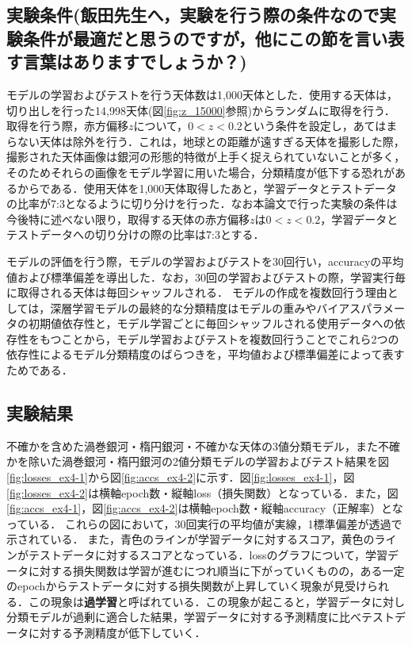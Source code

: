 \documentclass[a4j, 11pt]{jreport}
\begin{document}
\subsection{実験条件(飯田先生へ，実験を行う際の条件なので実験条件が最適だと思うのですが，他にこの節を言い表す言葉はありますでしょうか？)}
モデルの学習およびテストを行う天体数は1,000天体とした．使用する天体は，切り出しを行った14,998天体(図\ref{fig:z_15000}参照)からランダムに取得を行う．取得を行う際，赤方偏移$z$について，$0 < z < 0.2$という条件を設定し，あてはまらない天体は除外を行う．これは，地球との距離が遠すぎる天体を撮影した際，撮影された天体画像は銀河の形態的特徴が上手く捉えられていないことが多く，そのためそれらの画像をモデル学習に用いた場合，分類精度が低下する恐れがあるからである．使用天体を1,000天体取得したあと，学習データとテストデータの比率が7:3となるように切り分けを行った．なお本論文で行った実験の条件は今後特に述べない限り，取得する天体の赤方偏移$z$は$0 < z < 0.2$，学習データとテストデータへの切り分けの際の比率は7:3とする．

モデルの評価を行う際，モデルの学習およびテストを30回行い，accuracyの平均値および標準偏差を導出した．なお，30回の学習およびテストの際，学習実行毎に取得される天体は毎回シャッフルされる．
モデルの作成を複数回行う理由としては，深層学習モデルの最終的な分類精度はモデルの重みやバイアスパラメータの初期値依存性と，モデル学習ごとに毎回シャッフルされる使用データへの依存性をもつことから，モデル学習およびテストを複数回行うことでこれら2つの依存性によるモデル分類精度のばらつきを，平均値および標準偏差によって表すためである．


\subsection{実験結果}
不確かを含めた渦巻銀河・楕円銀河・不確かな天体の3値分類モデル，また不確かを除いた渦巻銀河・楕円銀河の2値分類モデルの学習およびテスト結果を図\ref{fig:losses_ex4-1}から図\ref{fig:accs_ex4-2}に示す．図\ref{fig:losses_ex4-1}，図\ref{fig:losses_ex4-2}は横軸epoch数・縦軸loss（損失関数）となっている．また，図\ref{fig:accs_ex4-1}，図\ref{fig:accs_ex4-2}は横軸epoch数・縦軸accuracy（正解率）となっている．
これらの図において，30回実行の平均値が実線，1標準偏差が透過で示されている．
また，青色のラインが学習データに対するスコア，黄色のラインがテストデータに対するスコアとなっている．lossのグラフについて，学習データに対する損失関数は学習が進むにつれ順当に下がっていくものの，ある一定のepochからテストデータに対する損失関数が上昇していく現象が見受けられる．この現象は\textbf{過学習}と呼ばれている．この現象が起こると，学習データに対し分類モデルが過剰に適合した結果，学習データに対する予測精度に比べテストデータに対する予測精度が低下していく．
\end{document}
